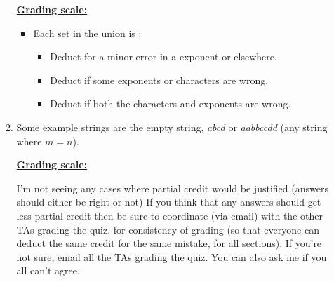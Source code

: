 \documentclass[11pt,fleqn]{article}
\begin{document}
\begin{enumerate}
\begin{enumerate}
                  \begin{info}{\textbf{\underline{Grading scale:}}}

                    \begin{itemize}

                      \addtolength{\itemsep}{2mm}

                      \item Each set in the union is :

                            \vspace{1mm}

                            \begin{itemize}

                              \addtolength{\itemsep}{-.5mm}

                              \item Deduct  for a minor error in a
                                    exponent or elsewhere.

                              \item Deduct  if some exponents
                                    or characters are wrong.

                              \item Deduct  if both the characters
                                    and exponents are wrong.

                            \end{itemize}

                            \vspace{0mm}

                    \end{itemize}

                  \end{info}

            \item Some example strings are the empty string, \emph{abcd} or
                  \emph{aabbccdd} (any string where $m = n$).

                  \begin{info}{\textbf{\underline{Grading scale:}}}

                    I'm not seeing any cases where partial credit would be
                    justified (answers should either be right or not) If you
                    think that any answers should get less partial credit
                    then be sure to coordinate (via email) with the other
                    TAs grading the quiz, for consistency of grading (so
                    that everyone can deduct the same credit for the same
                    mistake, for all sections).  If you're not sure, email
                    all the TAs grading the quiz.  You can also ask me if
                    you all can't agree.


\end{info}
\end{enumerate}
\end{enumerate}
\end{document}
